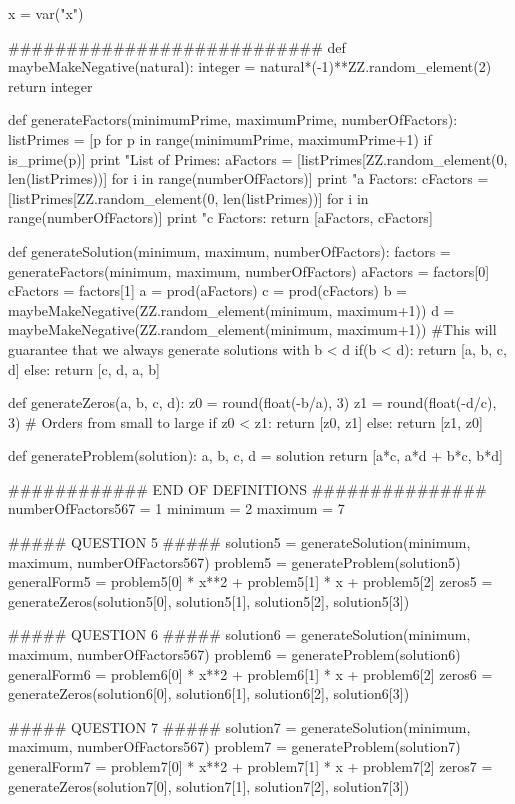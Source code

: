 \documentclass{ximera}
\begin{document}
\begin{sagesilent}
x = var("x")

###########################
def maybeMakeNegative(natural):
    integer = natural*(-1)**ZZ.random_element(2)
    return integer

def generateFactors(minimumPrime, maximumPrime, numberOfFactors):
    listPrimes = [p for p in range(minimumPrime, maximumPrime+1) if is_prime(p)]
    print "List of Primes: %
    aFactors = [listPrimes[ZZ.random_element(0, len(listPrimes))] for i in range(numberOfFactors)]
    print "a Factors: %
    cFactors = [listPrimes[ZZ.random_element(0, len(listPrimes))] for i in range(numberOfFactors)]
    print "c Factors: %
    return [aFactors, cFactors]
    
def generateSolution(minimum, maximum, numberOfFactors):
    factors = generateFactors(minimum, maximum, numberOfFactors)
    aFactors = factors[0]
    cFactors = factors[1]
    a = prod(aFactors)
    c = prod(cFactors)
    b = maybeMakeNegative(ZZ.random_element(minimum, maximum+1))
    d = maybeMakeNegative(ZZ.random_element(minimum, maximum+1))
    #This will guarantee that we always generate solutions with b < d
    if(b < d):
        return [a, b, c, d]
    else:
        return [c, d, a, b]

def generateZeros(a, b, c, d):    
    z0 = round(float(-b/a), 3)
    z1 = round(float(-d/c), 3)
    # Orders from small to large
    if z0 < z1:
        return [z0, z1]
    else:
        return [z1, z0]

def generateProblem(solution):
    a, b, c, d = solution
    return [a*c, a*d + b*c, b*d]

############ END OF DEFINITIONS ###############
numberOfFactors567 = 1
minimum = 2
maximum = 7

##### QUESTION 5 #####
solution5 = generateSolution(minimum, maximum, numberOfFactors567)
problem5 = generateProblem(solution5)
generalForm5 = problem5[0] * x**2 + problem5[1] * x + problem5[2]
zeros5 = generateZeros(solution5[0], solution5[1], solution5[2], solution5[3])

##### QUESTION 6 #####
solution6 = generateSolution(minimum, maximum, numberOfFactors567)
problem6 = generateProblem(solution6)
generalForm6 = problem6[0] * x**2 + problem6[1] * x + problem6[2]
zeros6 = generateZeros(solution6[0], solution6[1], solution6[2], solution6[3])

##### QUESTION 7 #####
solution7 = generateSolution(minimum, maximum, numberOfFactors567)
problem7 = generateProblem(solution7)
generalForm7 = problem7[0] * x**2 + problem7[1] * x + problem7[2]
zeros7 = generateZeros(solution7[0], solution7[1], solution7[2], solution7[3])


\end{sagesilent}
\end{document}
